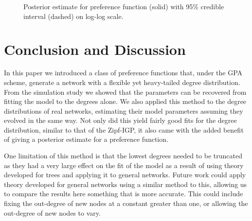 \documentclass[
  sn-basic,
]{sn-jnl}
\theoremstyle{plain}
\theoremstyle{plain}
\theoremstyle{remark}
\begin{document}
\begin{figure}


\caption{\label{fig-pa}Posterior estimate for preference function
(solid) with 95\% credible interval (dashed) on log-log scale.}

\end{figure}%

\newpage

\section{Conclusion and Discussion}\label{sec-conc}

In this paper we introduced a class of preference functions that, under
the GPA scheme, generate a network with a flexible yet heavy-tailed
degree distribution. From the simulation study we showed that the
parameters can be recovered from fitting the model to the degrees alone.
We also applied this method to the degree distributions of real
networks, estimating their model parameters assuming they evolved in the
same way. Not only did this yield fairly good fits for the degree
distribution, similar to that of the Zipf-IGP, it also came with the
added benefit of giving a posterior estimate for a preference function.

One limitation of this method is that the lowest degrees needed to be
truncated as they had a very large effect on the fit of the model as a
result of using theory developed for trees and applying it to general
networks. Future work could apply theory developed for general networks
using a similar method to this, allowing us to compare the results here
something that is more accurate. This could include fixing the
out-degree of new nodes at a constant greater than one, or allowing the
out-degree of new nodes to vary.
\end{document}
